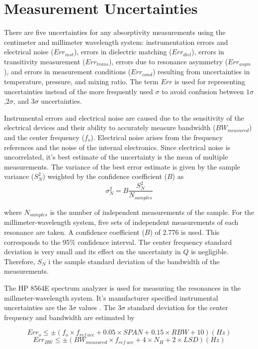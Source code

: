 \section{Measurement Uncertainties}

There are five uncertainties for any absorptivity measurements using the centimeter and millimeter wavelength system: instrumentation errors and electrical noise ($Err_{inst}$), errors in dielectric matching ($Err_{diel}$), errors in transitivity measurement ($Err_{trans}$), errors due to resonance asymmetry ($Err_{asym}$), and errors in measurement conditions ($Err_{cond}$) resulting from uncertainties in temperature, pressure, and mixing ratio. The term $Err$ is used for representing uncertainties instead of the more frequently used $\sigma$ to avoid confusion between $1\sigma$,$2\sigma$, and $3\sigma$ uncertainties.

Instrumental errors and electrical noise are caused due to the sensitivity of the electrical devices and their ability to accurately measure bandwidth ($BW_{measured}$) and the center frequency ($f_o$). Electrical noise arises from the frequency references and the noise of the internal electronics. Since electrical noise is uncorrelated, it's best estimate of the uncertainty is the mean of multiple measurements. The variance of the best error estimate is given by the sample variance ($S^2_N$) weighted by the confidence coefficient ($B$) as
\begin{equation}\label{eq:sigman}
\sigma^2_N = B \frac{S^2_N}{N_{samples}}
\end{equation}

\noindent where $N_{samples}$ is the number of independent measurements of the sample. For the millimeter-wavelength system, five sets of independent measurements of each resonance are taken. A confidence coefficient ($B$) of 2.776 is used. This corresponds to the 95\% confidence interval. The center frequency standard deviation is very small and its effect on the uncertainty in $Q$ is negligible. Therefore, $S_N$ i the sample standard deviation of the bandwidth of the measurements.

The HP 8564E spectrum analyzer is used for measuring the resonances in the millmeter-wavelength system. It's manufacturer specified instrumental uncertainties are the $3\sigma$ values \cite{Hewlett-Packard}. The $3\sigma$ standard deviation for the center frequency and bandwidth are estimated by 

\begin{equation}\label{eq:sigmao}
Err_o \leq \pm (f_o \times f_{ref\:acc} + 0.05 \times SPAN + 0.15 \times RBW +10 ) (Hz)
\end{equation}
\begin{equation}\label{eq:sigmabw}
Err_{BW} \leq \pm (BW_{measured} \times f_{ref\;acc} + 4 \times N_H +2 \times LSD ) (Hz)
\end{equation}

